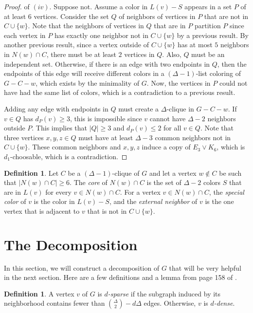 \documentclass[12pt]{article}
\theoremstyle{definition}
\newtheorem{definition}[theorem]{Definition}
\begin{document}
\begin{proof} of $(iv)$.
Suppose not. 
Assume a color in $L(v)-S$ appears in a set $P$ of at least $6$ vertices. 
Consider the set $Q$ of neighbors of vertices in $P$ that are not in $C\cup\{w\}$. 
Note that the neighbors of vertices in $Q$ that are in $P$ partition $P$ since each vertex in $P$ has exactly one neighbor not in $C\cup\{w\}$ by a previous result.
By another previous result, since a vertex outside of $C\cup\{w\}$ has at most $5$ neighbors in $N(w)\cap C$, there must be at least $2$ vertices in $Q$.
Also, $Q$ must be an independent set. 
Otherwise, if there is an edge with two endpoints in $Q$, then the endpoints of this edge will receive different colors in a $(\Delta-1)$-list coloring of $G-C-w$, which exists by the minimality of $G$. 
Now, the vertices in $P$ could not have had the same list of colors, which is a contradiction to a previous result. 

Adding any edge with endpoints in $Q$ must create a $\Delta$-clique in $G-C-w$. 
If $v\in Q$ has $d_P(v)\geq 3$, this is impossible since $v$ cannot have $\Delta-2$ neighbors outside $P$. 
This implies that $|Q|\geq 3$ and $d_P(v)\leq 2$ for all $v\in Q$. 
Note that three vertices $x, y, z\in Q$ must have at least $\Delta-3$ common neighbors not in $C\cup\{w\}$. 
These common neighbors and $x, y, z$ induce a copy of $E_3\vee K_6$, which is $d_1$-choosable, which is a contradiction.
\end{proof}

\begin{definition}
Let $C$ be a $(\Delta-1)$-clique of $G$ and let a vertex $w\not\in C$ be such that $|N(w)\cap C|\geq 6$. 
The {\it core} of $N(w)\cap C$ is the set of $\Delta-2$ colors $S$ that are in $L(v)$ for every $v\in N(w)\cap C$.
For a vertex $v\in N(w)\cap C$, the {\it special color} of $v$ is the color in $L(v)-S$, and the {\it external neighbor} of $v$ is the one vertex that is adjacent to $v$ that is not in $C\cup \{w\}$. 
\end{definition}

\section{The Decomposition}

In this section, we will construct a decomposition of $G$ that will be very helpful in the next section. Here are a few definitions and a lemma from page 158 of \cite{MR}.

\begin{definition}
A vertex $v$ of $G$ is {\it $d$-sparse} if the subgraph induced by its neighborhood contains fewer than ${\Delta\choose 2}-d\Delta$ edges. Otherwise, $v$ is {\it $d$-dense}. 
\end{definition}
\end{document}
